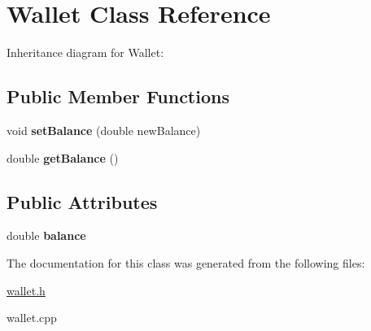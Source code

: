 \hypertarget{classWallet}{}\section{Wallet Class Reference}
\label{classWallet}


Inheritance diagram for Wallet\+:
\subsection*{Public Member Functions}
\begin{DoxyCompactItemize}
\item 
\mbox{\label{classWallet_a84887f86d53ddf090421365c8ac52661}} 
void {\bfseries set\+Balance} (double new\+Balance)
\item 
\mbox{\label{classWallet_a87b3f7dec77a607a67df9c5d5503b3c6}} 
double {\bfseries get\+Balance} ()
\end{DoxyCompactItemize}
\subsection*{Public Attributes}
\begin{DoxyCompactItemize}
\item 
\mbox{\label{classWallet_acb690105f6e130dac3c0dbd90e842d0a}} 
double {\bfseries balance}
\end{DoxyCompactItemize}


The documentation for this class was generated from the following files\+:\begin{DoxyCompactItemize}
\item 
\hyperlink{wallet_8h}{wallet.\+h}\item 
wallet.\+cpp\end{DoxyCompactItemize}
